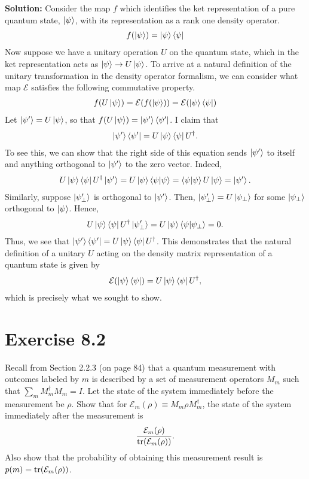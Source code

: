 \documentclass{book}
\newcommand{\mc}[1]{\mathcal{#1}}
\begin{document}
    \textbf{Solution:} Consider the map $f$ which identifies the ket representation of a pure quantum state, $\ket{\psi}$, with its representation as a rank one density operator.
    \begin{align}
        f(\ket{\psi}) = \ket{\psi}\bra{\psi}
    \end{align}
    Now suppose we have a unitary operation $U$ on the quantum state, which in the ket representation acts as $\ket{\psi}\to U\ket{\psi}$. To arrive at a natural definition of the unitary transformation in the density operator formalism, we can consider what map $\mc{E}$ satisfies the following commutative property.
    \begin{align}
        f(U\ket{\psi}) = \mc{E}(f(\ket{\psi})) = \mc{E}(\ket{\psi}\bra{\psi})
    \end{align}
    Let $\ket{\psi'} = U\ket{\psi}$, so that $f(U\ket{\psi}) = \ket{\psi'}\bra{\psi'}$. I claim that
    \begin{align}
        \ket{\psi'}\bra{\psi'} = U \ket{\psi}\bra{\psi} U^\dagger.
    \end{align}
    To see this, we can show that the right side of this equation sends $\ket{\psi'}$ to itself and anything orthogonal to $\ket{\psi'}$ to the zero vector. Indeed,
    \begin{align}
        U\ket{\psi}\bra{\psi}U^\dagger \ket{\psi'} = U \ket{\psi}\bra{\psi}\ket{\psi} = \bra{\psi}\ket{\psi} U \ket{\psi} = \ket{\psi'}.
    \end{align}
    Similarly, suppose $\ket{\psi'_\perp}$ is orthogonal to $\ket{\psi'}$. Then, $\ket{\psi'_\perp} = U \ket{\psi_\perp}$ for some $\ket{\psi_\perp}$ orthogonal to $\ket{\psi}$. Hence,
    \begin{align}
         U\ket{\psi}\bra{\psi}U^\dagger \ket{\psi'_\perp} = U\ket{\psi}\bra{\psi} \ket{\psi_\perp} = 0.
    \end{align}
    Thus, we see that $\ket{\psi'}\bra{\psi'} = U\ket{\psi}\bra{\psi}U^\dagger$. This demonstrates that the natural definition of a unitary $U$ acting on the density matrix representation of a quantum state is given by
    \begin{align}
        \mc{E}(\ket{\psi}\bra{\psi}) = U\ket{\psi}\bra{\psi}U^\dagger,
    \end{align}
    which is precisely what we sought to show. 
    
\section*{Exercise 8.2} 
    Recall from Section 2.2.3 (on page 84) that a quantum measurement with outcomes labeled by $m$ is described by a set of measurement operators $M_m$ such that $\sum_m M_m^\dagger M_m = I$. Let the state of the system immediately before the measurement be $\rho$. Show that for $\mc{E}_m(\rho) \equiv M_m \rho M_m^\dagger$, the state of the system immediately after the measurement is
    \begin{align} \label{eq:Exercise 8.2 final state}
        \frac{\mc{E}_m(\rho)}{\tr(\mc{E}_m(\rho))}.
    \end{align}
    Also show that the probability of obtaining this measurement result is $p(m) = \tr(\mc{E}_m(\rho))$.
    
\end{document}
